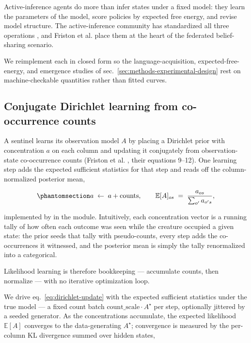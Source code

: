 \documentclass[
  english,
]{article}
\theoremstyle{plain}
\theoremstyle{definition}
\theoremstyle{remark}
\theoremstyle{definition}
\begin{document}
Active-inference agents do more than infer states under a fixed model:
they learn the parameters of the model, score policies by expected free
energy, and revise model structure. The active-inference community has
standardized all three operations
\citep{dacosta2020active, smith2020active}, and Friston et al.
\citeyearpar{friston2024federated} place them at the heart of the
federated belief-sharing scenario.

We reimplement each in closed form so the language-acquisition,
expected-free-energy, and emergence studies of
sec.~\ref{sec:methods-experimental-design} rest on machine-checkable
quantities rather than fitted curves.

\subsection{Conjugate Dirichlet learning from co-occurrence
counts}\label{sec:methods-dirichlet}

A sentinel learns its observation model \(A\) by placing a Dirichlet
prior with concentration \(a\) on each column and updating it
conjugately from observation-state co-occurrence counts (Friston et al.
\citeyearpar{friston2024federated}, their equations 9--12). One learning
step adds the expected sufficient statistics for that step and reads off
the column-normalized posterior mean,

\begin{equation}\protect\phantomsection\label{eq:dirichlet-update}{a \;\leftarrow\; a + \text{counts},
\qquad
\mathbb{E}[A]_{o s} \;=\; \frac{a_{o s}}{\sum_{o'} a_{o' s}},}\end{equation}

implemented by  in the
 module. Intuitively, each concentration
vector is a running tally of how often each outcome was seen while the
creature occupied a given state: the prior seeds that tally with
pseudo-counts, every step adds the co-occurrences it witnessed, and the
posterior mean is simply the tally renormalized into a categorical.

Likelihood learning is therefore bookkeeping --- accumulate counts, then
normalize --- with no iterative optimization loop.

We drive eq.~\ref{eq:dirichlet-update} with the expected sufficient
statistics under the true model --- a fixed count batch
\(\text{count\_scale}\cdot A^{\star}\) per step, optionally jittered by
a seeded generator. As the concentrations accumulate, the expected
likelihood \(\mathbb{E}[A]\) converges to the data-generating
\(A^{\star}\); convergence is measured by the per-column KL divergence
summed over hidden states,
\end{document}
